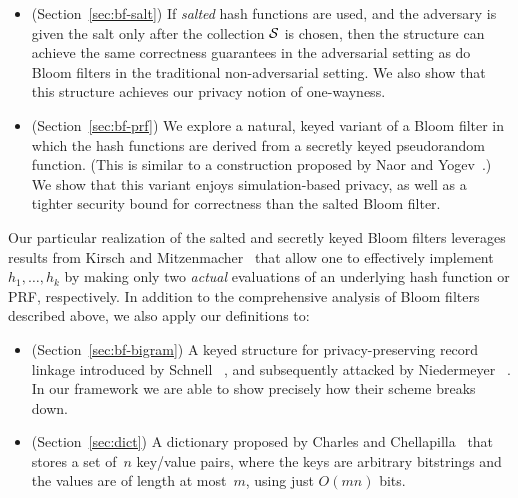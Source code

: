 {\begin{itemize}
  \item (Section~\ref{sec:bf-salt}) If \emph{salted} hash functions are used,
    and the adversary is given the salt only after the collection $\mathcal{S}$ is
    chosen, then %
    the structure can achieve the same correctness guarantees in the adversarial setting as do Bloom filters in the traditional
    non-adversarial setting. 
    We also show that this structure achieves our privacy notion of one-wayness.

  \item (Section~\ref{sec:bf-prf}) We explore a natural, keyed variant of a
    Bloom filter in which the hash functions are derived from a secretly keyed
    pseudorandom function. (This is similar to a construction proposed by Naor
    and Yogev~\cite{naor2015bloom}.) We show that this variant enjoys
    simulation-based privacy, as well as a tighter security bound for
    correctness than the salted Bloom filter.
\end{itemize}
%
\noindent
Our particular realization of the salted and secretly keyed Bloom filters
leverages results from Kirsch and Mitzenmacher~\cite{kirsch2006less} that allow
one to effectively implement $h_1,\ldots, h_k$ by making only two \emph{actual}
evaluations of an underlying hash function or PRF, respectively.
%
In addition to the comprehensive analysis of Bloom filters described above, we
also apply our definitions to:
\begin{itemize}
  \item (Section~\ref{sec:bf-bigram}) A keyed structure for privacy-preserving
    record linkage introduced by Schnell \etal~\cite{schnell2011novel}, and
    subsequently attacked by Niedermeyer
    \etal~\cite{niedermeyer2014cryptanalysis}. In our framework we are able to
    show precisely how their scheme breaks down.

  \item (Section~\ref{sec:dict}) A dictionary proposed by Charles
    and Chellapilla~\cite{charles2008bloomier2} that stores a set of~$n$
    key/value pairs, where the keys are arbitrary bitstrings and the values are
    of length at most~$m$, using just $O(mn)$ bits.
\end{itemize}
}
